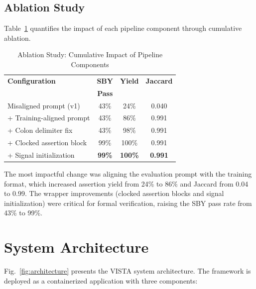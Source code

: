 \documentclass[conference]{IEEEtran}
\begin{document}
\subsection{Ablation Study}
\label{sec:ablation}

Table~\ref{tab:ablation} quantifies the impact of each pipeline component through cumulative ablation.

\begin{table}[t]
\centering
\caption{Ablation Study: Cumulative Impact of Pipeline Components}
\label{tab:ablation}
\begin{tabular}{@{}p{3.8cm}ccc@{}}
\toprule
\textbf{Configuration} & \textbf{SBY} & \textbf{Yield} & \textbf{Jaccard} \\
 & \textbf{Pass} & & \\
\midrule
Misaligned prompt (v1) & 43\% & 24\% & 0.040 \\
\quad + Training-aligned prompt & 43\% & 86\% & 0.991 \\
\quad + Colon delimiter fix & 43\% & 98\% & 0.991 \\
\quad + Clocked assertion block & 99\% & 100\% & 0.991 \\
\quad + Signal initialization & \textbf{99\%} & \textbf{100\%} & \textbf{0.991} \\
\bottomrule
\end{tabular}
\end{table}

The most impactful change was aligning the evaluation prompt with the training format, which increased assertion yield from 24\% to 86\% and Jaccard from 0.04 to 0.99. The wrapper improvements (clocked assertion blocks and signal initialization) were critical for formal verification, raising the SBY pass rate from 43\% to 99\%.

\section{System Architecture}
\label{sec:architecture}

Fig.~\ref{fig:architecture} presents the VISTA system architecture. The framework is deployed as a containerized application with three components:
\end{document}
